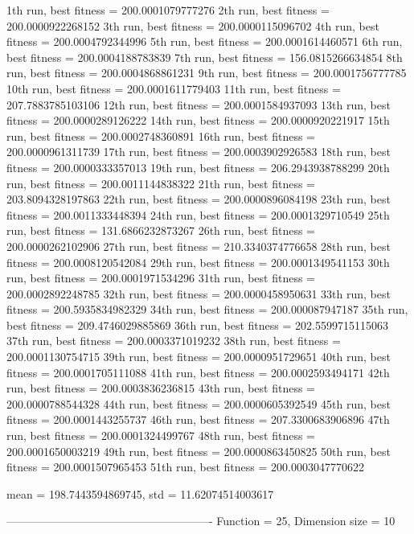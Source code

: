1th run, best fitness = 200.0001079777276
2th run, best fitness = 200.0000922268152
3th run, best fitness = 200.0000115096702
4th run, best fitness = 200.0004792344996
5th run, best fitness = 200.0001614460571
6th run, best fitness = 200.0004188783839
7th run, best fitness = 156.0815266634854
8th run, best fitness = 200.0004868861231
9th run, best fitness = 200.0001756777785
10th run, best fitness = 200.0001611779403
11th run, best fitness = 207.7883785103106
12th run, best fitness = 200.0001584937093
13th run, best fitness = 200.0000289126222
14th run, best fitness = 200.0000920221917
15th run, best fitness = 200.0002748360891
16th run, best fitness = 200.0000961311739
17th run, best fitness = 200.0003902926583
18th run, best fitness = 200.0000333357013
19th run, best fitness = 206.2943938788299
20th run, best fitness = 200.0011144838322
21th run, best fitness = 203.8094328197863
22th run, best fitness = 200.0000896084198
23th run, best fitness = 200.0011333448394
24th run, best fitness = 200.0001329710549
25th run, best fitness = 131.6866232873267
26th run, best fitness = 200.0000262102906
27th run, best fitness = 210.3340374776658
28th run, best fitness = 200.0008120542084
29th run, best fitness = 200.0001349541153
30th run, best fitness = 200.0001971534296
31th run, best fitness = 200.0002892248785
32th run, best fitness = 200.0000458950631
33th run, best fitness = 200.5935834982329
34th run, best fitness = 200.000087947187
35th run, best fitness = 209.4746029885869
36th run, best fitness = 202.5599715115063
37th run, best fitness = 200.0003371019232
38th run, best fitness = 200.0001130754715
39th run, best fitness = 200.0000951729651
40th run, best fitness = 200.0001705111088
41th run, best fitness = 200.0002593494171
42th run, best fitness = 200.0003836236815
43th run, best fitness = 200.0000788544328
44th run, best fitness = 200.0000605392549
45th run, best fitness = 200.0001443255737
46th run, best fitness = 207.3300683906896
47th run, best fitness = 200.0001324499767
48th run, best fitness = 200.0001650003219
49th run, best fitness = 200.0000863450825
50th run, best fitness = 200.0001507965453
51th run, best fitness = 200.0003047770622

mean = 198.7443594869745, std = 11.62074514003617

-------------------------------------------------------
Function = 25, Dimension size = 10

